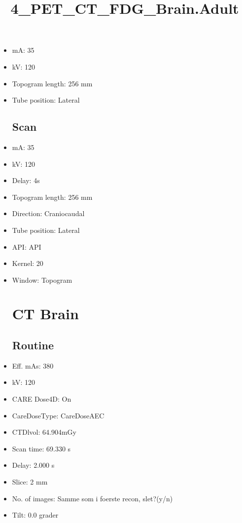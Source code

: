 \documentclass[12pt]{article}
\title{4\_PET\_CT\_FDG\_Brain.Adult}
\begin{document}
\maketitle
\newpage
\tableofcontents
\newpage
{}


\begin{itemize}\section{Topogram}
\subsection{Routine}
\item mA: 35\item kV: 120\item Topogram length: 256 mm\item Tube position: Lateral
\subsection{Scan}\item mA: 35\item kV: 120\item Delay: 4s\item Topogram length: 256 mm\item Direction: Craniocaudal\item Tube position: Lateral\item API: API \item Kernel: 20\item Window: Topogram
\section{CT Brain}
\subsection{Routine}
\item Eff. mAs: 380\item kV: 120\item CARE Dose4D: On\item CareDoseType: CareDoseAEC\item CTDlvol: 64.904mGy\item Scan time: 69.330 s\item Delay: 2.000 s\item Slice: 2 mm\item No. of images: Samme som i foerste recon, slet?(y/n)\item Tilt: 0.0 grader

\end{itemize}
\end{document}
